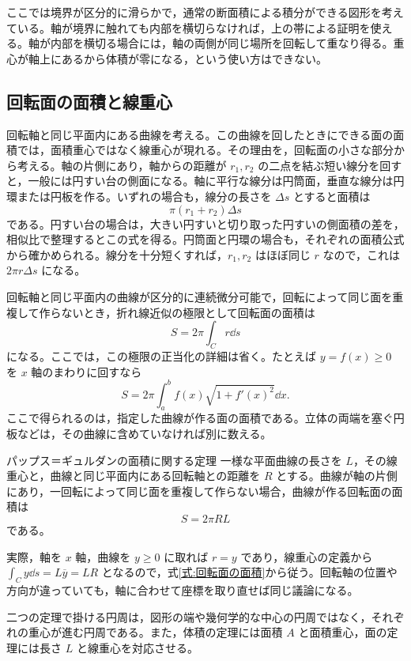 ここでは境界が区分的に滑らかで，通常の断面積による積分ができる図形を考えている。軸が境界に触れても内部を横切らなければ，上の帯による証明を使える。軸が内部を横切る場合には，軸の両側が同じ場所を回転して重なり得る。重心が軸上にあるから体積が零になる，という使い方はできない。

\subsection{回転面の面積と線重心}

回転軸と同じ平面内にある曲線を考える。この曲線を回したときにできる面の面積では，面積重心ではなく線重心が現れる。その理由を，回転面の小さな部分から考える。軸の片側にあり，軸からの距離が $r_1,r_2$ の二点を結ぶ短い線分を回すと，一般には円すい台の側面になる。軸に平行な線分は円筒面，垂直な線分は円環または円板を作る。いずれの場合も，線分の長さを $\Delta s$ とすると面積は
\[
\pi(r_1+r_2)\Delta s
\]
である。円すい台の場合は，大きい円すいと切り取った円すいの側面積の差を，相似比で整理するとこの式を得る。円筒面と円環の場合も，それぞれの面積公式から確かめられる。線分を十分短くすれば，$r_1,r_2$ はほぼ同じ $r$ なので，これは $2\pi r\Delta s$ になる。

回転軸と同じ平面内の曲線が区分的に連続微分可能で，回転によって同じ面を重複して作らないとき，折れ線近似の極限として回転面の面積は
\begin{equation}\label{式:回転面の面積}
S=2\pi\int_C r\dd s
\end{equation}
になる。ここでは，この極限の正当化の詳細は省く。たとえば $y=f(x)\geq0$ を $x$ 軸のまわりに回すなら
\[
S=2\pi\int_a^b f(x)\sqrt{1+f'(x)^2}\dd x.
\]
ここで得られるのは，指定した曲線が作る面の面積である。立体の両端を塞ぐ円板などは，その曲線に含めていなければ別に数える。

\begin{theorem}{パップス＝ギュルダンの面積に関する定理}
一様な平面曲線の長さを $L$，その線重心と，曲線と同じ平面内にある回転軸との距離を $R$ とする。曲線が軸の片側にあり，一回転によって同じ面を重複して作らない場合，曲線が作る回転面の面積は
\[
S=2\pi R L
\]
である。
\end{theorem}

実際，軸を $x$ 軸，曲線を $y\geq0$ に取れば $r=y$ であり，線重心の定義から $\int_C y\dd s=L\overline y=LR$ となるので，式\eqref{式:回転面の面積}から従う。回転軸の位置や方向が違っていても，軸に合わせて座標を取り直せば同じ議論になる。

二つの定理で掛ける円周は，図形の端や幾何学的な中心の円周ではなく，それぞれの重心が進む円周である。また，体積の定理には面積 $A$ と面積重心，面の定理には長さ $L$ と線重心を対応させる。

